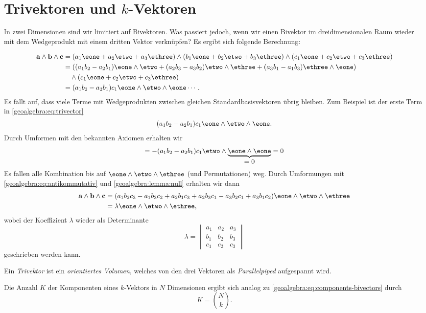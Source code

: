 \section{Trivektoren und $k$-Vektoren}
\label{geoalgebra:section:trivectors-n-vectors}
%
In zwei Dimensionen sind wir limitiert auf Bivektoren. Was passiert jedoch, wenn wir einen Bivektor
im dreidimensionalen Raum wieder mit dem Wedgeprodukt mit einem dritten Vektor verknüpfen?
Es ergibt sich folgende Berechnung:
{
\begin{align} 
\a \wedge \b \wedge \c
&=
(a_1 \eone + a_2 \etwo + a_3 \ethree) \wedge (b_1 \eone + b_2 \etwo + b_3 \ethree) \wedge (c_1 \eone + c_2 \etwo + c_3 \ethree)
\notag
\\
&=
((a_1 b_2 - a_2 b_1) \eone \wedge \etwo +(a_2 b_3 - a_3 b_2) \etwo \wedge \ethree +(a_3 b_1 - a_1 b_3) \ethree \wedge \eone)
\notag
\\
&\quad\wedge (c_1 \eone + c_2 \etwo + c_3 \ethree)
\notag
\\
&=
(a_1 b_2 - a_2 b_1) c_1 \eone \wedge \etwo \wedge \eone \cdots.
\label{geoalgebra:eq:trivector}
\end{align}
Es fällt auf, dass viele Terme mit Wedgeprodukten zwischen gleichen Standardbasisvektoren übrig bleiben. Zum Beispiel ist der erste Term in \eqref{geoalgebra:eq:trivector}
\begin{equation*}
(a_1 b_2 - a_2 b_1) c_1 \eone \wedge \etwo \wedge \eone.
\end{equation*}
Durch Umformen mit den bekannten Axiomen erhalten wir
\begin{equation*}
=-(a_1 b_2 - a_2 b_1) c_1 \etwo \wedge \underbrace{\eone \wedge \eone}_{\displaystyle =0} = 0
\end{equation*}
Es fallen alle Kombination bis auf $\eone \wedge \etwo \wedge \ethree$ (und Permutationen) weg.
Durch Umformungen mit
\eqref{geoalgebra:eq:antikommutativ} und
\eqref{geoalgebra:lemma:null}
erhalten wir dann
\begin{align*}
  \a \wedge \b \wedge \c &= (a_1 b_2 c_3 - a_1 b_3 c_2 + a_2 b_1 c_3 + a_2 b_3 c_1 - a_3 b_2 c_1 + a_3 b_1 c_2) \eone \wedge \etwo \wedge \ethree \\
  &= \lambda \eone \wedge \etwo \wedge \ethree,
\end{align*}
wobei der Koeffizient $\lambda$ wieder als Determinante
%
\begin{equation*}
\lambda = \begin{vmatrix} a_1 & a_2 & a_3 \\ b_1 & b_2 & b_3 \\ c_1 & c_2 & c_3 \end{vmatrix}
\end{equation*}
geschrieben werden kann.

Ein \emph{Trivektor} ist ein \emph{orientiertes Volumen}, welches von den drei Vektoren als \emph{Parallelpiped} aufgespannt wird.
%
%
%

Die Anzahl $K$ der Komponenten eines $k$-Vektors in $N$ Dimensionen ergibt sich analog zu \eqref{geoalgebra:eq:components-bivectors} durch
\begin{equation*}
  K = \binom{N}{k}.
\end{equation*}
}
